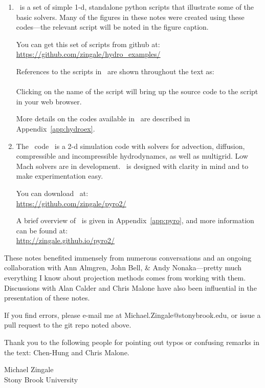\begin{enumerate}
\item \hydroex\ is a set of simple 1-d, standalone python scripts
  that illustrate some of the basic solvers.  Many of the figures
  in these notes were created using these codes---the relevant
  script will be noted in the figure caption.  

  You can get this set of scripts from github at:\\
  \url{https://github.com/zingale/hydro_examples/}

  References to the scripts in \hydroex\ are shown throughout
  the text as: \\[0.5em]
   \\[0.5em]
  Clicking on the name of the script will bring up the source code
  to the script in your web browser.

  More details on the codes available in \hydroex\ are described
  in Appendix~\ref{app:hydroex}.

\item  
  The \pyro\ code~\cite{pyro} is a 2-d simulation code with
  solvers for advection, diffusion, compressible and incompressible
  hydrodynamcs, as well as multigrid.  Low Mach solvers are 
  in development.  \pyro\ is designed with clarity in mind and to make 
  experimentation easy.  

  You can download \pyro\ at: \\
  \url{https://github.com/zingale/pyro2/} 

  A brief overview of \pyro\ is given in Appendix~\ref{app:pyro},
  and more information can be found at: \\
\url{http://zingale.github.io/pyro2/}
\end{enumerate}

These notes benefited immensely from numerous conversations and an ongoing
collaboration with Ann Almgren, John Bell, \& Andy Nonaka---pretty much
everything I know about projection methods comes from working with them.
Discussions with Alan Calder and Chris Malone have also been influential
in the presentation of these notes.

If you find errors, please e-mail me at Michael.Zingale@stonybrook.edu,
or issue a pull request to the git repo noted above.  

Thank you to the
following people for pointing out typos or confusing remarks in the text:
Chen-Hung and Chris Malone.


\begin{flushright}
Michael Zingale \\
Stony Brook University
\end{flushright}


